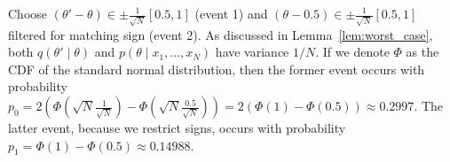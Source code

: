 \documentclass{article}
\begin{document}

Choose $(\theta' - \theta) \in \pm\frac{1}{\sqrt{N}}[0.5,1]$ (event 1) and $(\theta -0.5)
\in \pm\frac{1}{\sqrt{N}}[0.5,1]$ filtered for  matching sign (event 2).  As
discussed in Lemma~\ref{lem:worst_case}, both $q(\theta' \mid \theta)$ and
$p(\theta \mid x_1,\ldots,x_N)$ have variance $1/N$. If we denote $\Phi$ as the
CDF of the standard normal distribution, then the former event occurs with
probability $p_0 = 2(\Phi(\sqrt{N}\frac{1}{\sqrt{N}}) -
\Phi(\sqrt{N}\frac{0.5}{\sqrt{N}})) = 2(\Phi(1)-\Phi(0.5)) \approx 0.2997$. The
latter event, because we restrict signs, occurs with probability $p_1 =
\Phi(1) - \Phi(0.5) \approx 0.14988$. 
\end{document}
